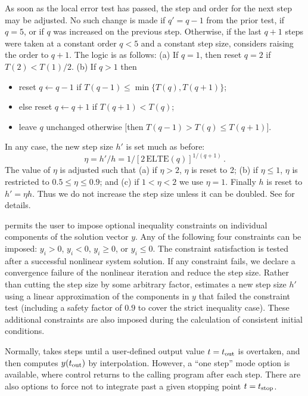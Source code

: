 As soon as the local error test has passed, the step and order for the
next step may be adjusted.  No such change is made if $q' = q-1$ from
the prior test, if $q = 5$, or if $q$ was increased on the previous
step.  Otherwise, if the last $q+1$ steps were taken at a constant
order $q < 5$ and a constant step size, {\ida} considers raising the order
to $q+1$.  The logic is as follows: (a) If $q = 1$, then reset $q = 2$
if $T(2) < T(1)/2$.  (b) If $q > 1$ then 
\begin{itemize}
\item reset $q \leftarrow q-1$ if $T(q-1) \leq \min\{T(q),T(q+1)\}$;
\item else reset $q \leftarrow q+1$ if $T(q+1) < T(q)$;
\item leave $q$ unchanged otherwise $[$then $T(q-1) > T(q) \leq T(q+1)]$.
\end{itemize}
In any case, the new step size $h'$ is set much as before:
\[ \eta = h'/h = 1/[2 \, \mbox{ELTE}(q)]^{1/(q+1)} \, . \]
The value of $\eta$ is adjusted such that (a) if $\eta > 2$, $\eta$ is
reset to 2; (b) if $\eta \leq 1$, $\eta$ is restricted to 
$0.5 \leq \eta \leq 0.9$; and (c) if $1 < \eta < 2$ we use $\eta = 1$.
Finally $h$ is reset to $h' = \eta h$.  Thus we do not increase the
step size unless it can be doubled.  See \cite{BCP:96} for details.

{\ida} permits the user to impose optional inequality constraints on individual 
components of the solution vector $y$. Any of the following four constraints 
can be imposed: $y_i > 0$, $y_i < 0$, $y_i \geq 0$, or $y_i \leq 0$. 
The constraint satisfaction is tested after a successful nonlinear system solution. 
If any constraint fails, we declare a convergence failure of the nonlinear iteration 
and reduce the step size. Rather than cutting the step size by some arbitrary factor, 
{\ida} estimates a new step size $h'$ using a linear approximation of the components 
in $y$ that failed the constraint test (including a safety factor of $0.9$ to 
cover the strict inequality case). These additional constraints are also imposed
during the calculation of consistent initial conditions.

Normally, {\ida} takes steps until a user-defined output value $t =
t_{\mbox{\scriptsize out}}$ is overtaken, and then computes
$y(t_{\mbox{\scriptsize out}})$ by interpolation.  However, a
``one step'' mode option is available, where control returns to the
calling program after each step.  There are also options to force {\ida}
not to integrate past a given stopping point $t = t_{\mbox{\scriptsize
stop}}$.


